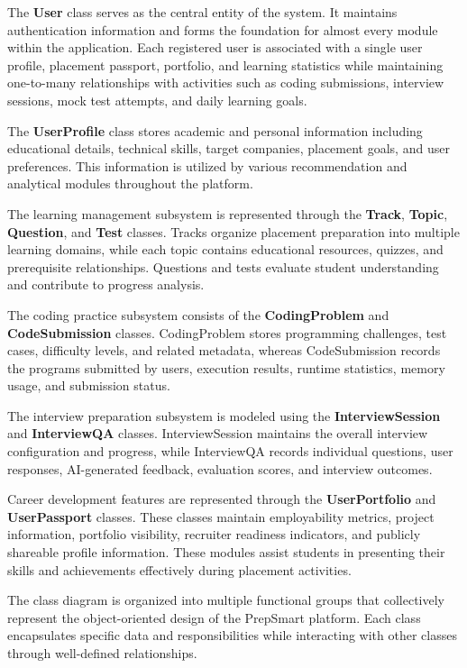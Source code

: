 The \textbf{User} class serves as the central entity of the system. It maintains authentication information and forms the foundation for almost every module within the application. Each registered user is associated with a single user profile, placement passport, portfolio, and learning statistics while maintaining one-to-many relationships with activities such as coding submissions, interview sessions, mock test attempts, and daily learning goals.

The \textbf{UserProfile} class stores academic and personal information including educational details, technical skills, target companies, placement goals, and user preferences. This information is utilized by various recommendation and analytical modules throughout the platform.

The learning management subsystem is represented through the \textbf{Track}, \textbf{Topic}, \textbf{Question}, and \textbf{Test} classes. Tracks organize placement preparation into multiple learning domains, while each topic contains educational resources, quizzes, and prerequisite relationships. Questions and tests evaluate student understanding and contribute to progress analysis.

The coding practice subsystem consists of the \textbf{CodingProblem} and \textbf{CodeSubmission} classes. CodingProblem stores programming challenges, test cases, difficulty levels, and related metadata, whereas CodeSubmission records the programs submitted by users, execution results, runtime statistics, memory usage, and submission status.

The interview preparation subsystem is modeled using the \textbf{InterviewSession} and \textbf{InterviewQA} classes. InterviewSession maintains the overall interview configuration and progress, while InterviewQA records individual questions, user responses, AI-generated feedback, evaluation scores, and interview outcomes.

Career development features are represented through the \textbf{UserPortfolio} and \textbf{UserPassport} classes. These classes maintain employability metrics, project information, portfolio visibility, recruiter readiness indicators, and publicly shareable profile information. These modules assist students in presenting their skills and achievements effectively during placement activities.

The class diagram is organized into multiple functional groups that collectively represent the object-oriented design of the PrepSmart platform. Each class encapsulates specific data and responsibilities while interacting with other classes through well-defined relationships.

